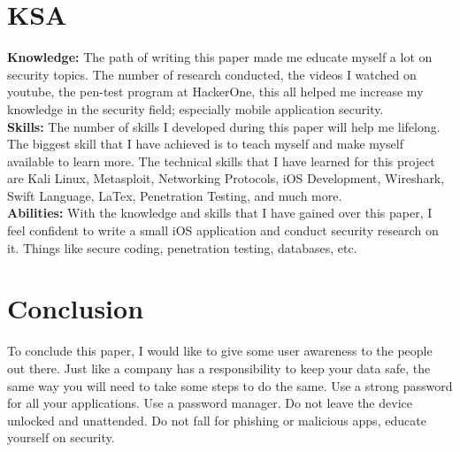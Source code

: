 \documentclass{article}
\begin{document}
\section{KSA}
\textbf{Knowledge:} The path of writing this paper made me educate myself a lot on security topics. The number of research conducted, the videos I watched on youtube, the pen-test program at HackerOne, this all helped me increase my knowledge in the security field; especially mobile application security.\\
\textbf{Skills:} The number of skills I developed during this paper will help me lifelong. The biggest skill that I have achieved is to teach myself and make myself available to learn more. The technical skills that I have learned for this project are Kali Linux, Metasploit, Networking Protocols, iOS Development, Wireshark, Swift Language, LaTex, Penetration Testing, and much more.\\
\textbf{Abilities:} With the knowledge and skills that I have gained over this paper, I feel confident to write a small iOS application and conduct security research on it. Things like secure coding, penetration testing, databases, etc.
\vspace{150mm}
\section{Conclusion}
To conclude this paper, I would like to give some user awareness to the people out there. Just like a company has a responsibility to keep your data safe, the same way you will need to take some steps to do the same. Use a strong password for all your applications. Use a password manager. Do not leave the device unlocked and unattended. Do not fall for phishing or malicious apps, educate yourself on security.
\end{document}
